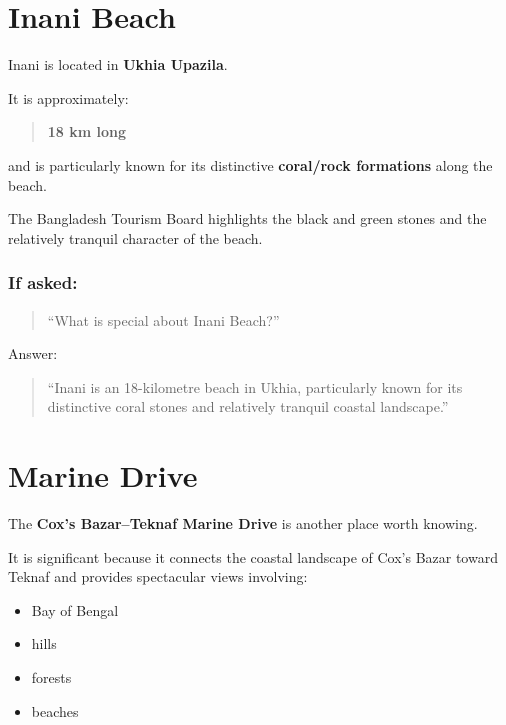 \medskip

\section{Inani Beach}

Inani is located in \textbf{Ukhia Upazila}.

It is approximately:

\begin{quote}
\textbf{18 km long}\\
\end{quote}

and is particularly known for its distinctive \textbf{coral/rock formations} along the beach.

The Bangladesh Tourism Board highlights the black and green stones and the relatively tranquil character of the beach.

\subsubsection{If asked:}

\begin{quote}
``What is special about Inani Beach?''\\
\end{quote}

Answer:

\begin{quote}
``Inani is an 18-kilometre beach in Ukhia, particularly known for its distinctive coral stones and relatively tranquil coastal landscape.''\\
\end{quote}

\medskip

\section{Marine Drive}

The \textbf{Cox's Bazar--Teknaf Marine Drive} is another place worth knowing.

It is significant because it connects the coastal landscape of Cox's Bazar toward Teknaf and provides spectacular views involving:

\begin{itemize}
  \item Bay of Bengal
  \item hills
  \item forests
  \item beaches
\end{itemize}

